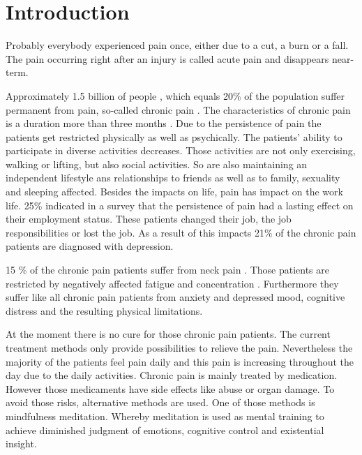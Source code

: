 \chapter{Introduction}

Probably everybody experienced pain once, either due to a cut, a burn or a fall. The pain occurring right after an injury is called acute pain and disappears near-term. \cite{Briggs2010;Mello2016}

Approximately 1.5 billion of people \cite{Zeidan2016}, which equals 20\% of the population suffer permanent from pain, so-called chronic pain \cite{Macfarlanea2016}. The characteristics of chronic pain is a duration more than three months \cite{Mello2016}. Due to the persistence of pain the patients get restricted physically as well as psychically. 
The patients' ability to participate in diverse activities decreases. Those activities are not only exercising, walking or lifting, but also social activities. So are also maintaining an independent lifestyle ans relationships to friends as well as to family, sexuality and sleeping affected. Besides the impacts on life, pain has impact on the work life. 25\% indicated in a survey that the persistence of pain had a lasting effect on their employment status. These patients changed their job, the job responsibilities or lost the job. 
As a result of this impacts 21\% of the chronic pain patients are diagnosed with depression. \cite{Breivik2006}

15 \% of the chronic pain patients suffer from neck pain \cite{Macfarlanea2016}. Those patients are restricted by negatively affected fatigue and concentration \cite{vanRanderaat2016}. Furthermore they suffer like all chronic pain patients from anxiety and depressed mood, cognitive distress and the resulting physical limitations. \cite{gross2013}

At the moment there is no cure for those chronic pain patients. The current treatment methods only provide possibilities to relieve the pain. \cite{marcus2009;pope2017} Nevertheless the majority of the patients feel pain daily and this pain is increasing throughout the day due to the daily activities. \cite{Breivik2006}
Chronic pain is mainly treated by medication. However those medicaments have side effects like abuse or organ damage. To avoid those risks, alternative methods are used. One of those methods is mindfulness meditation. Whereby meditation is used as mental training to achieve diminished judgment of emotions, cognitive control and existential insight. \cite{zeidan2012}

